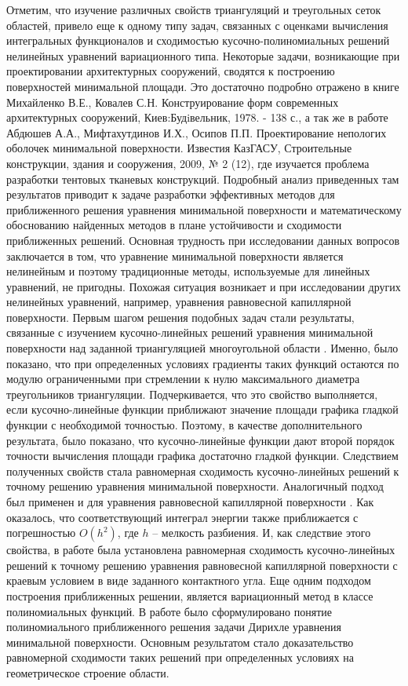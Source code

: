 \documentclass[a4paper,11pt,twoside]{article}
\begin{document}
Отметим, что изучение различных свойств триангуляций и треугольных сеток областей, привело еще к одному типу задач, связанных с оценками вычисления интегральных функционалов и сходимостью кусочно-полиномиальных решений нелинейных уравнений вариационного типа. Некоторые задачи, возникающие при проектировании архитектурных сооружений, сводятся к построению поверхностей минимальной площади. Это достаточно подробно отражено в  книге  Михайленко В.Е.,  Ковалев С.Н.  Конструирование форм современных архитектурных сооружений,  Киев:Будiвельник, 1978. - 138 с., а так же в работе Абдюшев А.А., Мифтахутдинов И.Х., Осипов П.П.   Проектирование непологих оболочек минимальной поверхности. Известия КазГАСУ, Строительные конструкции, здания и сооружения, 2009, № 2 (12), где  изучается проблема разработки тентовых тканевых конструкций. Подробный анализ приведенных там результатов   приводит к задаче разработки эффективных методов для приближенного решения уравнения минимальной поверхности и математическому обоснованию найденных методов в плане устойчивости и сходимости приближенных решений. Основная трудность при исследовании данных вопросов заключается в том, что уравнение минимальной поверхности является нелинейным и поэтому традиционные методы, используемые для линейных уравнений,  не пригодны. Похожая ситуация возникает и  при исследовании других нелинейных уравнений, например, уравнения равновесной капиллярной поверхности.   
Первым шагом решения подобных задач стали результаты, связанные с изучением  кусочно-линейных решений уравнения минимальной поверхности над заданной триангуляцией многоугольной области \cite{3}. Именно, было показано, что при определенных условиях градиенты таких функций остаются по модулю ограниченными при стремлении к нулю максимального диаметра треугольников триангуляции. Подчеркивается, что это свойство выполняется, если кусочно-линейные функции приближают значение площади графика гладкой функции с необходимой точностью. Поэтому, в качестве дополнительного результата, было показано, что кусочно-линейные функции дают второй порядок точности вычисления площади графика достаточно гладкой функции. Следствием полученных свойств стала равномерная сходимость кусочно-линейных решений к точному решению уравнения минимальной поверхности. Аналогичный подход был применен и для уравнения равновесной капиллярной поверхности \cite{4}. Как оказалось, что соответствующий интеграл энергии также приближается с погрешностью $O(h^2)$, где $h$ --   мелкость разбиения.  И, как следствие этого свойства,  в работе была установлена равномерная сходимость кусочно-линейных решений к точному решению уравнения равновесной капиллярной поверхности с краевым условием в виде заданного контактного угла. Еще одним подходом построения приближенных решении, является вариационный метод в классе полиномиальных функций. В работе \cite{5} было сформулировано понятие полиномиального приближенного решения задачи Дирихле  уравнения минимальной поверхности. Основным результатом стало доказательство равномерной сходимости таких решений при определенных условиях на геометрическое строение области.
\end{document}
